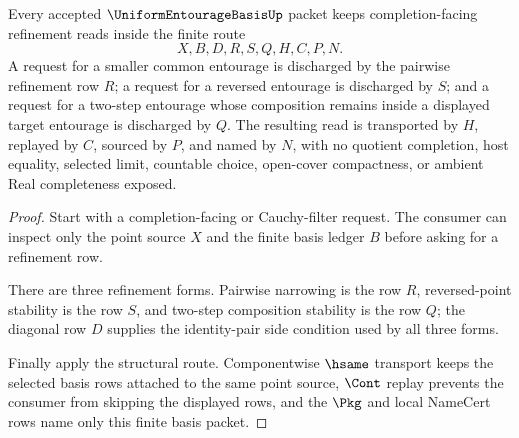 \begin{theorem}
\label{thm:uniform-entourage-basis-refinement-stability}
Every accepted $\UniformEntourageBasisUp$ packet keeps completion-facing refinement reads inside the finite route
$$
X,B,D,R,S,Q,H,C,P,N.
$$
A request for a smaller common entourage is discharged by the pairwise refinement row $R$; a request for a reversed entourage is discharged by $S$; and a request for a two-step entourage whose composition remains inside a displayed target entourage is discharged by $Q$. The resulting read is transported by $H$, replayed by $C$, sourced by $P$, and named by $N$, with no quotient completion, host equality, selected limit, countable choice, open-cover compactness, or ambient Real completeness exposed.
\end{theorem}
\begin{proof}
Start with a completion-facing or Cauchy-filter request. The consumer can inspect only the point source $X$ and the finite basis ledger $B$ before asking for a refinement row.

There are three refinement forms. Pairwise narrowing is the row $R$, reversed-point stability is the row $S$, and two-step composition stability is the row $Q$; the diagonal row $D$ supplies the identity-pair side condition used by all three forms.

Finally apply the structural route. Componentwise $\hsame$ transport keeps the selected basis rows attached to the same point source, $\Cont$ replay prevents the consumer from skipping the displayed rows, and the $\Pkg$ and local NameCert rows name only this finite basis packet.
\end{proof}




